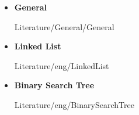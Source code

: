 \begin{itemize}
  \item
    \textbf{General}
    \begin{btSect}{Literature/General/General}
      \btPrintAll
    \end{btSect}
\end{itemize}
\newpage
\begin{itemize}
  \item
    \textbf{Linked List}
    \begin{btSect}{Literature/eng/LinkedList}
      \btPrintAll
    \end{btSect}
  \item
    \textbf{Binary Search Tree}
    \begin{btSect}{Literature/eng/BinarySearchTree}
      \btPrintAll
    \end{btSect}
\end{itemize}